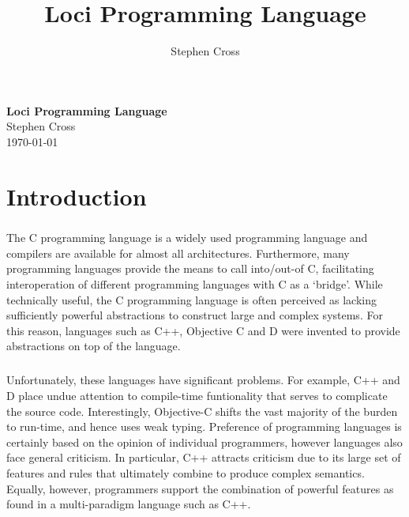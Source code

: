 \documentclass[12pt,twoside,notitlepage]{report}
\title{Loci Programming Language}
\author{Stephen Cross}
\begin{document}
\pagestyle{empty}

\vspace*{60mm}
\begin{center}
\Huge
{\bf Loci Programming Language} \\
\vspace*{5mm}
Stephen Cross \\
\vspace*{5mm}
\today  %
\end{center}

\cleardoublepage


\setcounter{page}{1}
\pagestyle{plain}

\tableofcontents

\listoffigures

\cleardoublepage


\setcounter{page}{1}
\pagestyle{headings}

\chapter{Introduction}

\paragraph{}
The C programming language is a widely used programming language and compilers are available for almost all architectures. Furthermore, many programming languages provide the means to call into/out-of C, facilitating interoperation of different programming languages with C as a `bridge'. While technically useful, the C programming language is often perceived as lacking sufficiently powerful abstractions to construct large and complex systems. For this reason, languages such as C++, Objective C and D were invented to provide abstractions on top of the language.

\paragraph{}
Unfortunately, these languages have significant problems. For example, C++ and D place undue attention to compile-time funtionality that serves to complicate the source code. Interestingly, Objective-C shifts the vast majority of the burden to run-time, and hence uses weak typing. Preference of programming languages is certainly based on the opinion of individual programmers, however languages also face general criticism. In particular, C++ attracts criticism due to its large set of features and rules that ultimately combine to produce complex semantics. Equally, however, programmers support the combination of powerful features as found in a multi-paradigm language such as C++.
\end{document}
